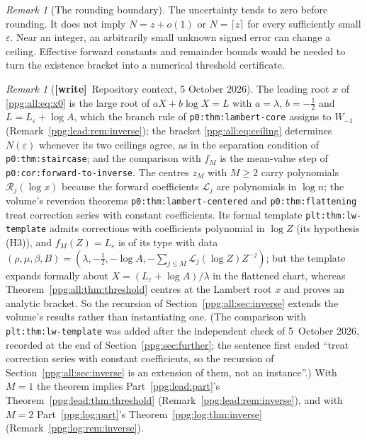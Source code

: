 \documentclass[11pt,letterpaper]{article}
\theoremstyle{remark}\newtheorem{remark}[theorem]{Remark}
\numberwithin{equation}{section}
\newcommand{\wtag}{\textup{\textbf{[write]}}}
\begin{document}
\begin{remark}[The rounding boundary]
The uncertainty tends to zero before rounding. It does not imply
$N=z+o(1)$ or $N=\lceil z\rceil$ for every sufficiently small $\varepsilon$. Near an integer, an arbitrarily small unknown signed error can change a ceiling. Effective forward constants and remainder bounds would be needed to turn the existence bracket into a numerical threshold certificate.
\end{remark}

\begin{remark}[\wtag\ Repository context, 5 October 2026]\label{ppg:all:rem:inverse}
The leading root $x$ of \eqref{ppg:all:eq:x0} is the large root of $aX+b\log X=L$ with $a=\lambda$, $b=-\frac12$ and $L=L_\varepsilon+\log A$, which the branch rule of \texttt{p0:thm:lambert-core} \cite{tsvol} assigns to $W_{-1}$ (Remark~\ref{ppg:lead:rem:inverse}); the bracket \eqref{ppg:all:eq:ceiling} determines $N(\varepsilon)$ whenever its two ceilings agree, as in the separation condition of \texttt{p0:thm:staircase}; and the comparison with $f_M$ is the mean-value step of \texttt{p0:cor:forward-to-inverse}. The centres $z_M$ with $M\ge2$ carry polynomials $\mathcal R_j(\log x)$ because the forward coefficients $\mathcal L_j$ are polynomials in $\log n$; the volume's reversion theorems \texttt{p0:thm:lambert-centered} and \texttt{p0:thm:flattening} treat correction series with constant coefficients. Its formal template \texttt{plt:thm:lw-template} admits corrections with coefficients polynomial in $\log Z$ (its hypothesis (H3)), and $f_M(Z)=L_\varepsilon$ is of its type with data $(\rho,\mu,\beta,B)=(\lambda,-\frac12,-\log A,-\sum_{j\le M}\mathcal L_j(\log Z)Z^{-j})$; but the template expands formally about $X=(L_\varepsilon+\log A)/\lambda$ in the flattened chart, whereas Theorem~\ref{ppg:all:thm:threshold} centres at the Lambert root $x$ and proves an analytic bracket. So the recursion of Section~\ref{ppg:all:sec:inverse} extends the volume's results rather than instantiating one. (The comparison with \texttt{plt:thm:lw-template} was added after the independent check of 5~October 2026, recorded at the end of Section~\ref{ppg:sec:further}; the sentence first ended ``treat correction series with constant coefficients, so the recursion of Section~\ref{ppg:all:sec:inverse} is an extension of them, not an instance''.) With $M=1$ the theorem implies Part~\ref{ppg:lead:part}'s Theorem~\ref{ppg:lead:thm:threshold} (Remark~\ref{ppg:lead:rem:inverse}), and with $M=2$ Part~\ref{ppg:log:part}'s Theorem~\ref{ppg:log:thm:inverse} (Remark~\ref{ppg:log:rem:inverse}).
\end{remark}
\end{document}
